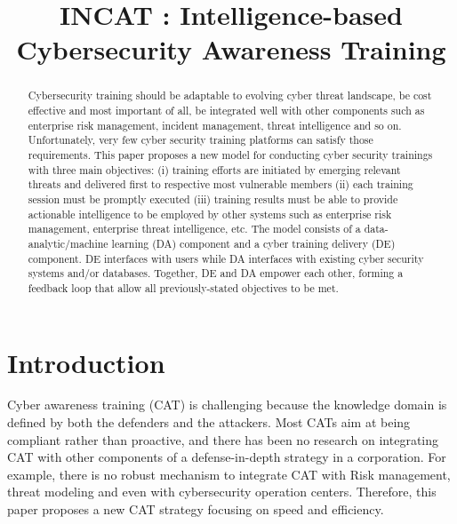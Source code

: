 \documentclass[conference]{IEEEtran}
\begin{document}
\title{INCAT : Intelligence-based Cybersecurity Awareness Training
}


\author{
}

\maketitle

\begin{abstract}
Cybersecurity training should be adaptable to evolving cyber threat landscape, be cost effective and most important of all, be integrated well with other components such as enterprise risk management, incident management, threat intelligence and so on. Unfortunately, very few cyber security training platforms can satisfy those requirements. This paper proposes a new model for conducting cyber security trainings with three main objectives: (i) training efforts are initiated by emerging relevant threats and delivered first to respective most vulnerable members (ii) each training session must be
promptly executed (iii) training results must be able to provide actionable intelligence to be employed by other systems such as enterprise risk management, enterprise threat intelligence, etc. The model consists of a data-analytic/machine learning (DA) component and a cyber training delivery (DE) component. DE interfaces with users while DA interfaces with existing cyber security systems and/or databases. Together, DE and DA empower each other, forming a feedback loop that allow all previously-stated objectives to be met.
\end{abstract}





%
\IEEEpeerreviewmaketitle

\section{Introduction}
Cyber awareness training (CAT) is challenging because the knowledge domain is defined by both the defenders and the attackers. Most CATs aim at being compliant rather than proactive, and there has been no research on integrating CAT with other components of a defense-in-depth strategy in a corporation. For example, there is no robust mechanism to integrate CAT with Risk management, threat modeling and even with cybersecurity operation centers. Therefore, this paper proposes a new CAT strategy focusing on speed and efficiency.
\end{document}
